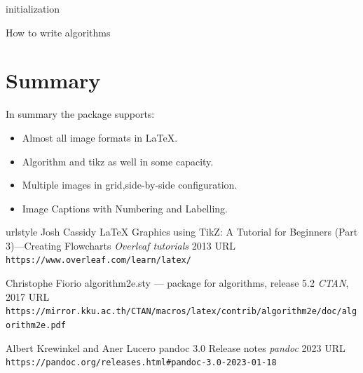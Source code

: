 \begin{algorithm}[htbp]
\SetAlgoLined
{}
initialization\;
\caption{How to write algorithms}
  \label{alg:how}
\end{algorithm}


\section{Summary}

In summary the  package supports:
\begin{itemize}
\item Almost all image formats in LaTeX.
\item Algorithm and tikz as well in some capacity.
\item Multiple images in grid,side-by-side configuration.
\item Image Captions with Numbering and Labelling.
\end{itemize}



\begin{thebibliography}{4}
    \providecommand{\natexlab}[1]{#1}
    \providecommand{\url}[1]{\texttt{#1}}
    \expandafter\ifx\csname urlstyle\endcsname\relax
      \providecommand{\doi}[1]{doi: #1}\else
      \providecommand{\doi}{doi: \begingroup \urlstyle{rm}\Url}\fi
{}
Josh Cassidy
\newblock LaTeX Graphics using TikZ: A Tutorial for Beginners (Part 3)—Creating Flowcharts
\newblock \emph{Overleaf tutorials}  2013
\newblock URL \url{https://www.overleaf.com/learn/latex/}

Christophe Fiorio
\newblock algorithm2e.sty — package for algorithms, release 5.2
\newblock \emph{CTAN}, 2017
\newblock URL \url{https://mirror.kku.ac.th/CTAN/macros/latex/contrib/algorithm2e/doc/algorithm2e.pdf}

Albert Krewinkel and Aner Lucero
\newblock pandoc 3.0 Release notes
\newblock \emph{pandoc}  2023
\newblock URL \url{https://pandoc.org/releases.html#pandoc-3.0-2023-01-18}

\end{thebibliography}


\address{%
Abhishek Ulayil\\
Student, Institute of Actuaries of India\\%
Mumbai, India\\
ORCiD: 0009-0000-6935-8690\\
}

